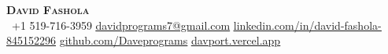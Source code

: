 \begin{center}
    \textbf{\Huge \scshape David Fashola} \\ \vspace{1pt}
     \ \small +1 519-716-3959 \quad
    \href{mailto:davidprograms7@gmail.com}{ \underline{davidprograms7@gmail.com}} \quad
    \href{https://www.linkedin.com/in/david-fashola-845152296/}{ \underline{linkedin.com/in/david-fashola-845152296}} \quad
    \href{https://github.com/Daveprograms}{ \underline{github.com/Daveprograms}} \quad
    \href{https://davport.vercel.app/}{ \underline{davport.vercel.app}}
\end{center}
